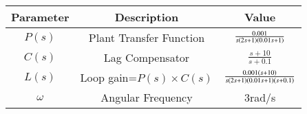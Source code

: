 \begin{tabular}{|c|c|c|}
\hline
    Parameter & Description & Value\\
    \hline
    $P(s)$ & Plant Transfer Function & $\frac{0.001}{s\left(2s+1\right)\left(0.01s+1\right)}$\\
    \hline
    $C(s)$ & Lag Compensator  & $\frac{s+10}{s+0.1}$\\
    \hline
    $L(s)$ & Loop gain=$P(s) \times C(s)$  & $\frac{0.001\left(s+10\right)}{s\left(2s+1\right)\left(0.01s+1\right)\left(s+0.1\right)}$ \\
    \hline
    $\omega$ & Angular Frequency & 3rad/s \\
    \hline
\end{tabular}
